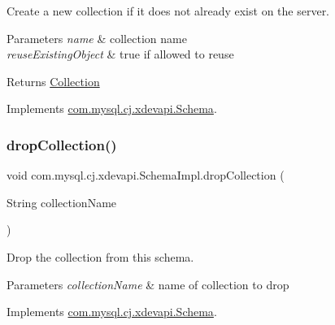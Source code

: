 Create a new collection if it does not already exist on the server.


\begin{DoxyParams}{Parameters}
{\em name} & collection name \\
\hline
{\em reuse\+Existing\+Object} & true if allowed to reuse \\
\hline
\end{DoxyParams}
\begin{DoxyReturn}{Returns}
\mbox{\hyperlink{interfacecom_1_1mysql_1_1cj_1_1xdevapi_1_1_collection}{Collection}} 
\end{DoxyReturn}


Implements \mbox{\hyperlink{interfacecom_1_1mysql_1_1cj_1_1xdevapi_1_1_schema_a81c42de36893c03f73f130ec5d7080f5}{com.\+mysql.\+cj.\+xdevapi.\+Schema}}.

\mbox{\label{classcom_1_1mysql_1_1cj_1_1xdevapi_1_1_schema_impl_a8420b65714f543e4bd4a113edeadeb14}} 
\subsubsection{\texorpdfstring{drop\+Collection()}{dropCollection()}}
{\footnotesize\ttfamily void com.\+mysql.\+cj.\+xdevapi.\+Schema\+Impl.\+drop\+Collection (\begin{DoxyParamCaption}\item[{String}]{collection\+Name }\end{DoxyParamCaption})}

Drop the collection from this schema.


\begin{DoxyParams}{Parameters}
{\em collection\+Name} & name of collection to drop \\
\hline
\end{DoxyParams}


Implements \mbox{\hyperlink{interfacecom_1_1mysql_1_1cj_1_1xdevapi_1_1_schema_aed2eef7be93416d42ed6b1d6c86bccdd}{com.\+mysql.\+cj.\+xdevapi.\+Schema}}.

\mbox{\label{classcom_1_1mysql_1_1cj_1_1xdevapi_1_1_schema_impl_a587cff9708d8d6787ad6012fd0353d5f}} 
